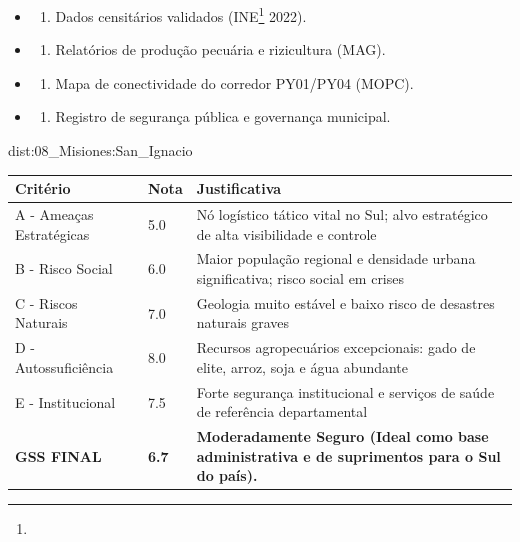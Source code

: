 {\begin{itemize}
\tightlist
\item
  \begin{enumerate}
  \def\labelenumi{\arabic{enumi})}
  \tightlist
  \item
    Dados censitários validados (INE\footnote{\fineINE} 2022).
  \end{enumerate}
\item
  \begin{enumerate}
  \def\labelenumi{\arabic{enumi})}
  \setcounter{enumi}{1}
  \tightlist
  \item
    Relatórios de produção pecuária e rizicultura (MAG).
  \end{enumerate}
\item
  \begin{enumerate}
  \def\labelenumi{\arabic{enumi})}
  \setcounter{enumi}{2}
  \tightlist
  \item
    Mapa de conectividade do corredor PY01/\allowbreak PY04 (MOPC).
  \end{enumerate}
\item
  \begin{enumerate}
  \def\labelenumi{\arabic{enumi})}
  \setcounter{enumi}{3}
  \tightlist
  \item
    Registro de segurança pública e governança municipal.
  \end{enumerate}
\end{itemize}}{dist:08_Misiones:San_Ignacio}
\begin{table}[ht!]
\small \begin{tabular}{p{3.0cm}p{0.8cm}p{6.0cm}} \toprule
\textbf{Critério} & \textbf{Nota} & \textbf{Justificativa} \\ \midrule
A - Ameaças Estratégicas & 5.0 & Nó logístico tático vital no Sul; alvo estratégico de alta visibilidade e controle \\
B - Risco Social & 6.0 & Maior população regional e densidade urbana significativa; risco social em crises \\
C - Riscos Naturais & 7.0 & Geologia muito estável e baixo risco de desastres naturais graves \\
D - Autossuficiência & 8.0 & Recursos agropecuários excepcionais: gado de elite, arroz, soja e água abundante \\
E - Institucional & 7.5 & Forte segurança institucional e serviços de saúde de referência departamental \\
\midrule \textbf{GSS FINAL} & \textbf{6.7} & \textbf{Moderadamente Seguro (Ideal como base administrativa e de suprimentos para o Sul do país).} \\ \bottomrule \end{tabular}
\end{table}
